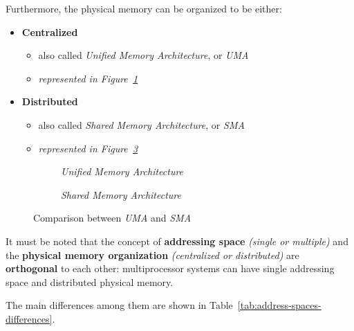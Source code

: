 \documentclass[english]{article}
\begin{document}
\begin{minipage}{\textwidth}
  \bigskip
  Furthermore, the physical memory can be organized to be either:
  \begin{itemize}
    \item \textbf{Centralized}
          \begin{itemize}
            \item also called \textit{Unified Memory Architecture}, or \textit{UMA}
            \item \textit{represented in Figure~\ref{subfig:uma}}
          \end{itemize}
    \item \textbf{Distributed}
          \begin{itemize}
            \item also called \textit{Shared Memory Architecture}, or \textit{SMA}
            \item \textit{represented in Figure~\ref{subfig:sma}}
          \end{itemize}
  \end{itemize}
  \bigskip
\end{minipage}

\begin{figure}[htbp]
  \bigskip
  \centering
  \begin{subfigure}[t]{0.495\textwidth}
    \centering
    \caption{\textit{Unified Memory Architecture}}
    \label{subfig:uma}
  \end{subfigure}
  \begin{subfigure}[t]{0.495\textwidth}
    \centering
    \caption{\textit{Shared Memory Architecture}}
    \label{subfig:sma}
  \end{subfigure}
  \caption{Comparison between \textit{UMA} and \textit{SMA}}
  \bigskip
\end{figure}

\bigskip
It must be noted that the concept of \textbf{addressing space} \textit{(single or multiple)} and the \textbf{physical memory organization} \textit{(centralized or distributed)} are \textbf{orthogonal} to each other:
multiprocessor systems can have single addressing space and distributed physical memory.

The main differences among them are shown in Table~\ref{tab:address-spaces-differences}.
\end{document}
